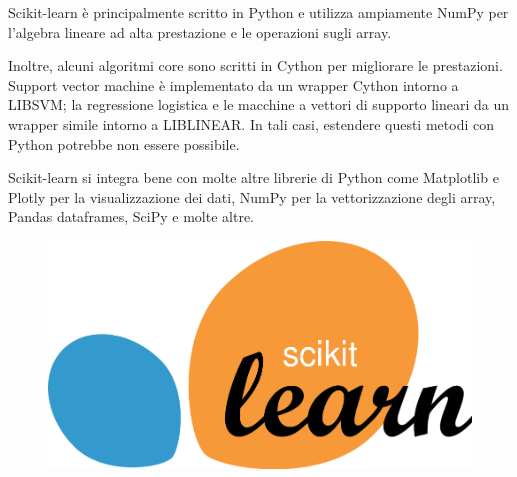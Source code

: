 Scikit-learn è principalmente scritto in Python e utilizza ampiamente NumPy per l'algebra lineare ad alta prestazione e le operazioni sugli array. 

Inoltre, alcuni algoritmi core sono scritti in Cython per migliorare le prestazioni. Support vector machine è implementato da un wrapper Cython intorno a LIBSVM; la regressione logistica e le macchine a vettori di supporto lineari da un wrapper simile intorno a LIBLINEAR. In tali casi, estendere questi metodi con Python potrebbe non essere possibile.

Scikit-learn si integra bene con molte altre librerie di Python come Matplotlib e Plotly per la visualizzazione dei dati, NumPy per la vettorizzazione degli array, Pandas dataframes, SciPy e molte altre.

\begin{figure}
    \begin{center}    
        \includegraphics[width=0.7 \linewidth]{images/image9.png}
    \end{center}
\end{figure}

